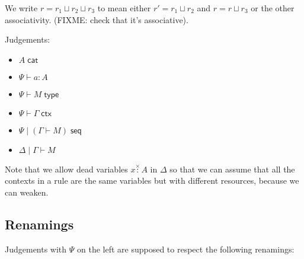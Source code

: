 \documentclass{amsart}
\let\types\vdash %
\def\cb{\mid} %
\def\p{^+} %
\def\m{^-}
\let\mypm\pm
\def\pm{^\mypm}
\newcommand\uns{\times}
\def\cat{\;\mathsf{cat}}
\def\type{\;\mathsf{type}}
\def\ctx{\;\mathsf{ctx}}
\def\pcol{\overset{\scriptscriptstyle +}{:}}
\def\mcol{\overset{\scriptscriptstyle -}{:}}
\def\pmcol{\overset{\scriptscriptstyle \pm}{:}}
\def\uncol{\overset{\scriptscriptstyle \times}{:}}
\def\ok{\;\mathsf{seq}}
\newcommand\combine{\sqcup}
\newcommand\triv{\_}
\begin{document}
We write $r = r_1 \combine r_2 \combine r_3$ to mean 
either $r' = r_1 \combine r_2$ and 
$r = r \combine r_3$ or the other associativity.  
(FIXME: check that it's associative).  

Judgements:

\begin{itemize}

\item $A \cat$

\item $\Psi \types a : A$

\item $\Psi \types M \type$

\item $\Psi \types \Gamma \ctx$

\item $\Psi \cb (\Gamma \vdash M) \ok$

\item $\Delta \cb \Gamma \vdash M$

\end{itemize}

Note that we allow dead variables $x \uncol A$ in $\Delta$ so that we
can assume that all the contexts in a rule are the same variables but
with different resources, because we can weaken.  

\subsection*{Renamings}

Judgements with $\Psi$ on the left are supposed to respect the following
renamings:
\end{document}
